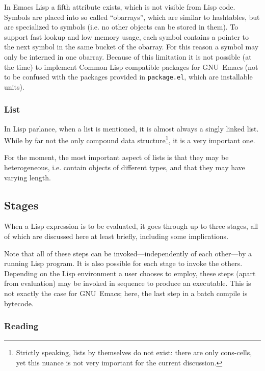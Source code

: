 \documentclass[a4paper,10pt,twoside]{report}
\newcommand{\el}{Emacs Lisp}
\newcommand{\cl}{Common Lisp}
\newcommand{\fun}[1]{\texttt{#1}}
\newcommand{\emacs}{GNU~Emacs}
\begin{document}
In \el{} a fifth attribute exists, which is not visible from Lisp code.  Symbols
are placed into so called ``obarrays'', which are similar to hashtables, but are
specialized to symbols (i.e. no other objects can be stored in them).  To
support fast lookup and low memory usage, each symbol contains a pointer to the
next symbol in the same bucket of the obarray.  For this reason a symbol may
only be interned in one obarray.\cite[Section 8.3 ``Creating and Interning
Symbols'']{elisp-reference} Because of this limitation it is not possible (at
the time) to implement \cl{} compatible packages for \emacs{} (not to be
confused with the packages provided in \fun{package.el}, which are installable
units).

\subsubsection{List}
\label{subsubsec:list}

In Lisp parlance, when a list is mentioned, it is almost always a singly linked
list.  While by far not the only compound data structure\footnote{Strictly
  speaking, lists by themselves do not exist: there are only cons-cells, yet
  this nuance is not very important for the current discussion.}, it is a very
important one.

For the moment, the most important aspect of lists is that they may be
heterogeneous, i.e. contain objects of different types, and that they may have
varying length.

\subsection{Stages}
\label{subsec:stages}

When a Lisp expression is to be evaluated, it goes through up to three stages,
all of which are discussed here at least briefly, including some implications.

Note that all of these steps can be invoked---independently of each other---by a
running Lisp program.  It is also possible for each stage to invoke the others.
Depending on the Lisp environment a user chooses to
employ, these steps (apart from evaluation) may be invoked in sequence to
produce an executable.  This is not exactly the case for \emacs{}; here, the
last step in a batch compile is bytecode.

\subsubsection{Reading}
\label{subsubsec:reading}
\end{document}
